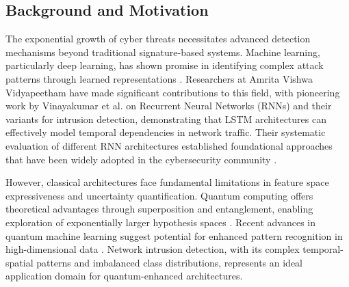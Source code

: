 \documentclass[conference]{IEEEtran}
\begin{document}
\subsection{Background and Motivation}
The exponential growth of cyber threats necessitates advanced detection mechanisms beyond traditional signature-based systems. Machine learning, particularly deep learning, has shown promise in identifying complex attack patterns through learned representations \cite{ref1}. Researchers at Amrita Vishwa Vidyapeetham have made significant contributions to this field, with pioneering work by Vinayakumar et al. \cite{vinayakumar2017rnn} on Recurrent Neural Networks (RNNs) and their variants for intrusion detection, demonstrating that LSTM architectures can effectively model temporal dependencies in network traffic. Their systematic evaluation of different RNN architectures established foundational approaches that have been widely adopted in the cybersecurity community \cite{vinayakumar2017applying}.

However, classical architectures face fundamental limitations in feature space expressiveness and uncertainty quantification. Quantum computing offers theoretical advantages through superposition and entanglement, enabling exploration of exponentially larger hypothesis spaces \cite{ref2}. Recent advances in quantum machine learning suggest potential for enhanced pattern recognition in high-dimensional data \cite{ref3}. Network intrusion detection, with its complex temporal-spatial patterns and imbalanced class distributions, represents an ideal application domain for quantum-enhanced architectures.
\end{document}
